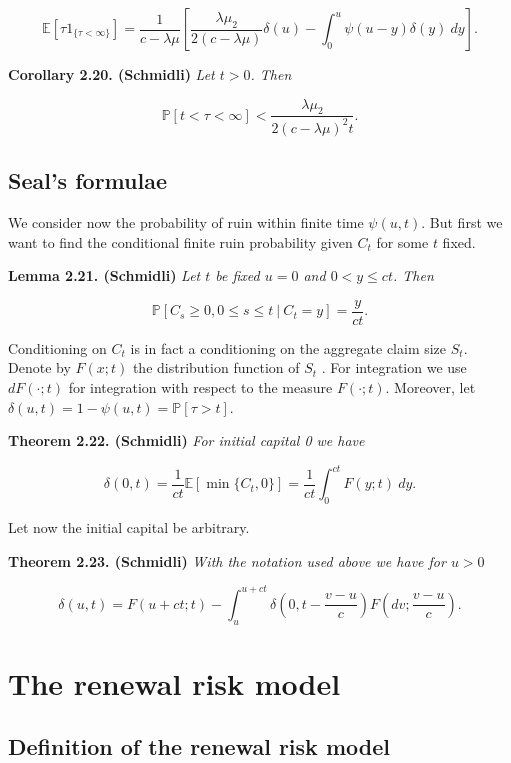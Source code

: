 \documentclass[a4paper,10pt,openany]{book}
\begin{document}
\[
\mathbb E[\tau 1_{\{\tau<\infty\}}]=\frac{1}{c-\lambda\mu}\left[\frac{\lambda\mu_2}{2(c-\lambda\mu)}\delta(u)-\int_0^u\psi(u-y)\delta(y)\ dy\right].
\]

\textbf{Corollary 2.20. (Schmidli)} \emph{Let \(t>0\). Then}

\[
\mathbb P[t<\tau<\infty]<\frac{\lambda \mu_2}{2(c-\lambda\mu)^2t}.
\]

\hypertarget{seals-formulae}{%
\subsection{Seal's formulae}\label{seals-formulae}}

We consider now the probability of ruin within finite time \(\psi(u, t)\). But first we want to find the conditional finite ruin probability given \(C_t\) for some \(t\) fixed.

\textbf{Lemma 2.21. (Schmidli)} \emph{Let \(t\) be fixed \(u=0\) and \(0< y\le ct\). Then}

\[
\mathbb P[C_s\ge 0,0\le s\le t\ \vert\ C_t=y]=\frac{y}{ct}.
\]

Conditioning on \(C_t\) is in fact a conditioning on the aggregate claim size \(S_t\). Denote by \(F(x; t)\) the distribution function of \(S_t\) . For integration we use \(dF (\cdot; t)\) for integration with respect to the measure \(F (\cdot; t)\). Moreover, let \(\delta(u, t) = 1 − \psi(u, t) = \mathbb P [\tau > t]\).

\textbf{Theorem 2.22. (Schmidli)} \emph{For initial capital 0 we have}

\[
\delta (0,t)=\frac{1}{ct}\mathbb E[\min\{C_t,0\}]=\frac{1}{ct}\int_0^{ct}F(y;t)\ dy.
\]

Let now the initial capital be arbitrary.

\textbf{Theorem 2.23. (Schmidli)} \emph{With the notation used above we have for \(u>0\)}

\[
\delta (u,t)=F(u+ct; t)-\int_u^{u+ct}\delta\left(0,t-\frac{v-u}{c}\right) F\left(dv;\frac{v-u}{c}\right).
\]

\hypertarget{the-renewal-risk-model}{%
\section{The renewal risk model}\label{the-renewal-risk-model}}

\hypertarget{definition-of-the-renewal-risk-model}{%
\subsection{Definition of the renewal risk model}\label{definition-of-the-renewal-risk-model}}
\end{document}
